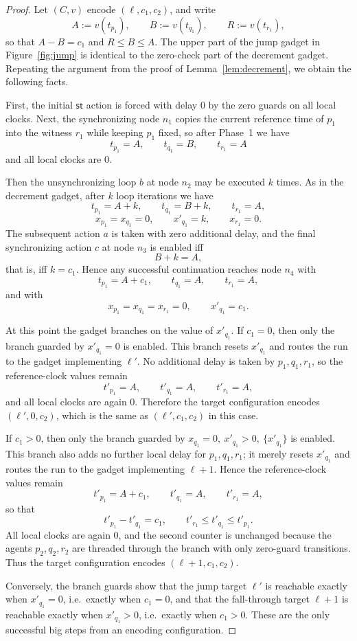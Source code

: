 \begin{proof}
Let $(C,v)$ encode $(\ell,c_1,c_2)$, and write
\[
A:=v(t_{p_1}),\qquad B:=v(t_{q_1}),\qquad R:=v(t_{r_1}),
\]
so that $A-B=c_1$ and $R\le B\le A$.  The upper part of the jump gadget in
Figure~\ref{fig:jump} is identical to the zero-check part of the decrement
gadget.  Repeating the argument from the proof of Lemma~\ref{lem:decrement}, we
obtain the following facts.

First, the initial $\mathsf{st}$ action is forced with delay $0$ by the zero
guards on all local clocks.  Next, the synchronizing node $n_1$ copies the
current reference time of $p_1$ into the witness $r_1$ while keeping $p_1$
fixed, so after Phase~1 we have
\[
t_{p_1}=A,\qquad t_{q_1}=B,\qquad t_{r_1}=A
\]
and all local clocks are $0$.

Then the unsynchronizing loop $b$ at node $n_2$ may be executed $k$ times.  As
in the decrement gadget, after $k$ loop iterations we have
\[
t_{p_1}=A+k,\qquad t_{q_1}=B+k,\qquad t_{r_1}=A,
\]
\[
x_{p_1}=x_{q_1}=0,\qquad x'_{q_1}=k,\qquad x_{r_1}=0.
\]
The subsequent action $a$ is taken with zero additional delay, and the final
synchronizing action $c$ at node $n_3$ is enabled iff
\[
B+k=A,
\]
that is, iff $k=c_1$.  Hence any successful continuation reaches node $n_4$
with
\[
t_{p_1}=A+c_1,\qquad t_{q_1}=A,\qquad t_{r_1}=A,
\]
and with
\[
x_{p_1}=x_{q_1}=x_{r_1}=0,\qquad x'_{q_1}=c_1.
\]

At this point the gadget branches on the value of $x'_{q_1}$.
If $c_1=0$, then only the branch guarded by $x'_{q_1}=0$ is enabled.  This
branch resets $x'_{q_1}$ and routes the run to the gadget implementing
$\ell'$.  No additional delay is taken by $p_1,q_1,r_1$, so the reference-clock
values remain
\[
t'_{p_1}=A,\qquad t'_{q_1}=A,\qquad t'_{r_1}=A,
\]
and all local clocks are again $0$.  Therefore the target configuration encodes
$(\ell',0,c_2)$, which is the same as $(\ell',c_1,c_2)$ in this case.

If $c_1>0$, then only the branch guarded by
$x_{q_1}=0,\ x'_{q_1}>0,\ \{x'_{q_1}\}$ is enabled.  This branch also adds no
further local delay for $p_1,q_1,r_1$; it merely resets $x'_{q_1}$ and routes
the run to the gadget implementing $\ell+1$.  Hence the reference-clock values
remain
\[
t'_{p_1}=A+c_1,\qquad t'_{q_1}=A,\qquad t'_{r_1}=A,
\]
so that
\[
t'_{p_1}-t'_{q_1}=c_1,
\qquad
t'_{r_1}\le t'_{q_1}\le t'_{p_1}.
\]
All local clocks are again $0$, and the second counter is unchanged because the
agents $p_2,q_2,r_2$ are threaded through the branch with only zero-guard
transitions.  Thus the target configuration encodes $(\ell+1,c_1,c_2)$.

Conversely, the branch guards show that the jump target $\ell'$ is reachable
exactly when $x'_{q_1}=0$, i.e.\ exactly when $c_1=0$, and that the fall-through
target $\ell+1$ is reachable exactly when $x'_{q_1}>0$, i.e.\ exactly when
$c_1>0$.  These are the only successful big steps from an encoding
configuration.
\end{proof}


